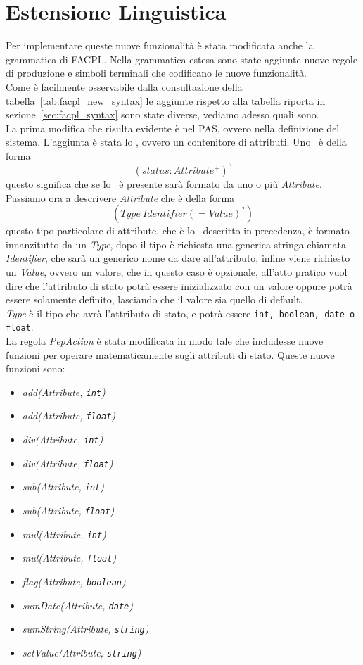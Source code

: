 \section{Estensione Linguistica} %
\label{sec:estensione_linguistica}
Per implementare queste nuove funzionalità è stata modificata anche la grammatica di FACPL.
Nella grammatica estesa sono state aggiunte nuove regole di produzione e simboli terminali che 
codificano le nuove funzionalità.\\

Come è facilmente osservabile dalla consultazione della tabella~\ref{tab:facpl_new_syntax} le aggiunte rispetto alla tabella riporta in sezione~\ref{sec:facpl_syntax} sono state diverse, vediamo adesso quali sono.\\
La prima modifica che risulta evidente è nel PAS, ovvero nella definizione del sistema. L'aggiunta è stata lo \status, ovvero un contenitore di attributi.
Uno \status \ è della forma $$(status: Attribute^+)^?$$ questo significa che se lo \status \ è presente sarà formato da uno o più \textit{Attribute}.\\
Passiamo ora a descrivere \textit{Attribute} che è della forma $$(Type\ Identifier (= Value)^?)$$
questo tipo particolare di attribute, che è lo \statusattribute \ descritto in precedenza, è formato innanzitutto da un \textit{Type}, dopo il tipo è richiesta una generica stringa chiamata \textit{Identifier}, che sarà un generico nome da dare all'attributo, infine viene richiesto un \textit{Value}, ovvero un valore, che in questo caso è opzionale, all'atto pratico vuol dire che l'attributo di stato potrà essere inizializzato con un valore oppure potrà essere solamente definito, lasciando che il valore sia quello di default.\\
\textit{Type} è il tipo che avrà l'attributo di stato, e potrà essere \texttt{int, boolean, date o float}.\\
La regola \textit{PepAction} è stata modificata in modo tale che includesse nuove funzioni per operare matematicamente sugli attributi di stato.
Queste nuove funzioni sono:
\begin{itemize}
	\item \textit{add(Attribute, \texttt{int})}
	\item \textit{add(Attribute, \texttt{float})}
	\item \textit{div(Attribute, \texttt{int})}
	\item \textit{div(Attribute, \texttt{float})}
	\item \textit{sub(Attribute, \texttt{int})}
	\item \textit{sub(Attribute, \texttt{float})}
	\item \textit{mul(Attribute, \texttt{int})}
	\item \textit{mul(Attribute, \texttt{float})}
	\item \textit{flag(Attribute, \texttt{boolean})}
	\item \textit{sumDate(Attribute, \texttt{date})} 
	\item \textit{sumString(Attribute, \texttt{string})}
	\item \textit{setValue(Attribute, \texttt{string})}
\end{itemize}

